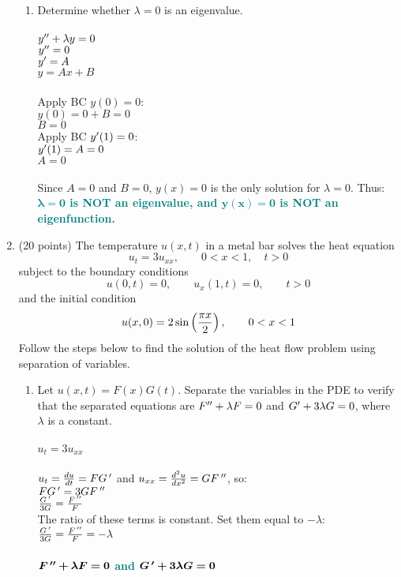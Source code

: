\documentclass{article}
\begin{document}
\begin{enumerate}
\begin{enumerate}
\item
Determine whether $\lambda=0$ is an eigenvalue.\\\\
$y\sp{\prime\prime}+\lambda y=0$\\
$y\sp{\prime\prime}=0$\\
$y\sp{\prime}=A$\\
$y = Ax + B$\\\\
Apply BC $y(0)=0$:\\
$y(0) = 0 + B = 0$\\
$B = 0$\\
Apply BC $y\sp\prime(1)=0$:\\
$y\sp{\prime}(1) = A = 0$\\
$A = 0$\\\\
Since $A=0$ and $B=0$, $y(x)=0$ is the only solution for $\lambda=0$. Thus:\\
\textcolor{teal}{\textbf{$\bm{\lambda = 0}$ is NOT an eigenvalue, and $\bm{y(x)=0}$ is NOT an eigenfunction.}}

\end{enumerate}


\newpage
\item (20 points) The temperature $u(x,t)$ in a metal bar solves the heat equation
\[
u_t=3u_{xx},\qquad 0<x<1,\quad t>0
\]
subject to the boundary conditions
\[
u(0,t)=0,\qquad u_x(1,t)=0,\qquad t>0
\]
and the initial condition
\[
u(x,0)=2\sin\left({\pi x\over2}\right),\qquad 0<x<1
\]
Follow the steps below to find the solution of the heat flow problem using separation of variables.
\begin{enumerate}
\item Let $u(x,t)=F(x)G(t)$.  Separate the variables in the PDE to verify that the separated equations are $F\sp{\prime\prime}+\lambda F=0$ and $G\sp\prime+3\lambda G=0$, where $\lambda$ is a constant.\\\\
$u_t=3u_{xx}$\\\\
$u_t = {du\over dt} = FG\,\sp\prime$ and $u_{xx} = {d^2u\over dx^2} = GF\,\sp{\prime\prime}$, so:\\
$FG\,\sp\prime = 3GF\,\sp{\prime\prime}$\\
${G\,\sp\prime\over 3G} = {F\,\sp{\prime\prime} \over F}$\\
The ratio of these terms is constant. Set them equal to $-\lambda$:\\
${G\,\sp\prime\over 3G} = {F\,\sp{\prime\prime} \over F} = -\lambda$\\\\
\textcolor{teal}{\textbf{$\bm{F\,\sp{\prime\prime} + \lambda F = 0}$ and $\bm{G\,\sp\prime + 3\lambda G = 0}$}}\\



\end{enumerate}
\end{enumerate}
\end{document}
